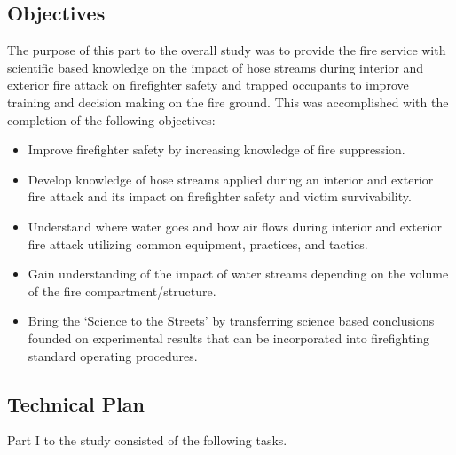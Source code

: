 \documentclass{article}
\begin{document}
\subsection {Objectives}

The purpose of this part to the overall study was to provide the fire service with scientific based knowledge on the impact of hose streams during interior and exterior fire attack on firefighter safety and trapped occupants to improve training and decision making on the fire ground. This was accomplished with the completion of the following objectives:

\begin{itemize}
	\item Improve firefighter safety by increasing knowledge of fire suppression.
	\item Develop knowledge of hose streams applied during an interior and exterior fire attack and its impact on firefighter safety and victim survivability.
	\item Understand where water goes and how air flows during interior and exterior fire attack utilizing common equipment, practices, and tactics.
	\item Gain understanding of the impact of water streams depending on the volume of the fire compartment/structure.
	\item Bring the `Science to the Streets' by transferring science based conclusions founded on experimental results that can be incorporated into firefighting standard operating procedures.
	\end{itemize}


\clearpage

\subsection{Technical Plan}

Part I to the study consisted of the following tasks. 
\end{document}
